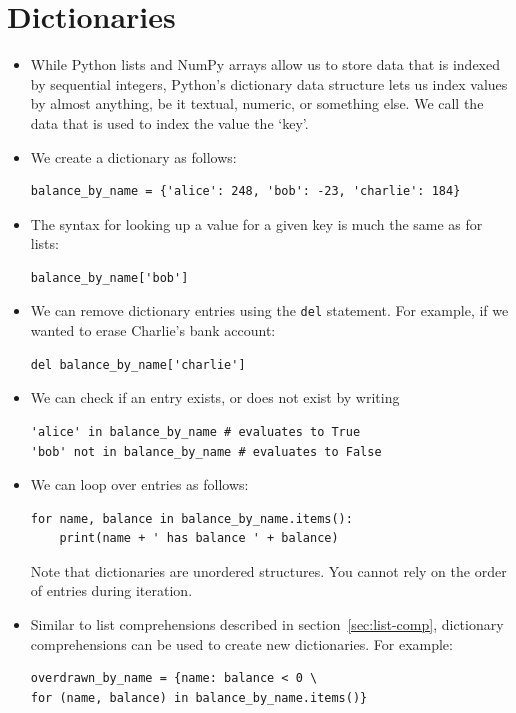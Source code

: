 \documentclass[a4paper,twoside,titlepage]{memoir}
\newcommand{\shellcmd}{\texttt}
\begin{document}
\section{Dictionaries}
\begin{itemize}
\item While Python lists and NumPy arrays allow us to store data that is indexed by sequential integers, Python's dictionary data structure lets us index values by almost anything, be it textual, numeric, or something else.  We call the data that is used to index the value the `key'.
\item We create a dictionary as follows:
\begin{verbatim}
balance_by_name = {'alice': 248, 'bob': -23, 'charlie': 184}
\end{verbatim}

\item The syntax for looking up a value for a given key is much the same as for lists:
\begin{verbatim}
balance_by_name['bob']
\end{verbatim}

\item We can remove dictionary entries using the \shellcmd{del} statement.  For example, if we wanted to erase Charlie's bank account:
\index{del@\shellcmd{del}}
\begin{verbatim}
del balance_by_name['charlie']
\end{verbatim}

\item We can check if an entry exists, or does not exist by writing
\begin{verbatim}
'alice' in balance_by_name # evaluates to True
'bob' not in balance_by_name # evaluates to False
\end{verbatim}

\item We can loop over entries as follows:
\begin{verbatim}
for name, balance in balance_by_name.items():
	print(name + ' has balance ' + balance)
\end{verbatim}
Note that dictionaries are unordered structures.  You cannot rely on the order of entries during iteration.

\item Similar to list comprehensions described in section~\ref{sec:list-comp}, dictionary comprehensions can be used to create new dictionaries.  For example:
\begin{verbatim}
overdrawn_by_name = {name: balance < 0 \
for (name, balance) in balance_by_name.items()}
\end{verbatim}
\end{itemize}
\end{document}
